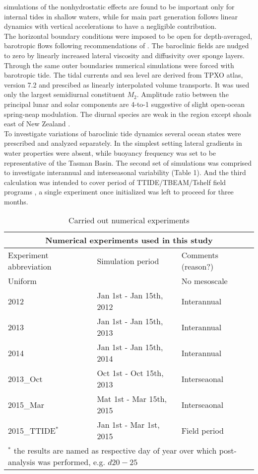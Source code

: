 \documentclass[12pt]{article}
\begin{document}
simulations of \citep{kang2012energetics, zhang2011three} the nonhydrostatic effects are found to 
be important only for internal tides in shallow waters, while for main part generation follows 
linear dynamics with vertical accelerations to have a negligible contribution.\\
The horizontal boundary conditions were imposed to be open for depth-averaged, barotropic flows 
following recommendations of \citep{marchesiello2001open}. The baroclinic fields are 
nudged to zero by linearly increased lateral viscosity and diffusivity over sponge layers. Through 
the same outer boundaries numerical simulations were forced with barotropic tide. The tidal 
currents and sea level are derived from TPXO atlas, version 7.2 \citep{egbert2002efficient} and 
prescibed as linearly interpolated volume transports. It was used only the largest semidiurnal 
constituent $M_2$. Amplitude ratio between the principal lunar and solar components are 4-to-1 
suggestive of slight open-ocean spring-neap modulation. The diurnal species are weak in the region 
except shoals east of New Zealand \citep{walters2001ocean}.\\
To investigate variations of baroclinic tide dynamics several ocean states were prescribed and 
analyzed separately. In the simplest setting lateral gradients in water properties were absent, 
while buoyancy frequency was set to be representative of the Tasman Basin. The second set of 
simulations 
was comprised to investigate interannual and interseasonal variability (Table 1). And the third 
calculation was intended to cover period of TTIDE/TBEAM/Tshelf field programs 
\citep{pinkel2015breaking}, a single experiment once initialized was left to proceed for three 
months.
\begin{table}
	\caption{Carried out numerical experiments}
	\begin{tabular}{ |p{3cm}||p{5cm}|p{5cm}|  }
		\hline
		\multicolumn{3}{|c|}{Numerical experiments used in this study} \\
		\hline
		Experiment abbreviation & Simulation period & Comments (reason?) \\
		\hline
		Uniform & ~ & No mesoscale \\
		2012 &   Jan 1st - Jan 15th, 2012 & Interannual \\
		2013 &   Jan 1st - Jan 15th, 2013 & Interannual \\
		2014 &   Jan 1st - Jan 15th, 2014 & Interannual \\
		2013\_Oct &   Oct 1st - Oct 15th, 2013 & Interseaonal \\
		2015\_Mar &   Mat 1st - Mar 15th, 2015 & Interseaonal \\
		2015\_TTIDE$^{\ast}$ &   Jan 1st - Mar 1st, 2015 & Field period \\
		\hline
		\multicolumn{3}{|l|}{\footnotesize$^{\ast}$ the results are named as respective day of 
		year over which post-analysis was performed, e.g. $d20-25$ }\\
		\hline
	\end{tabular}
	\label{ch2:table_exp}
\end{table}
\end{document}
